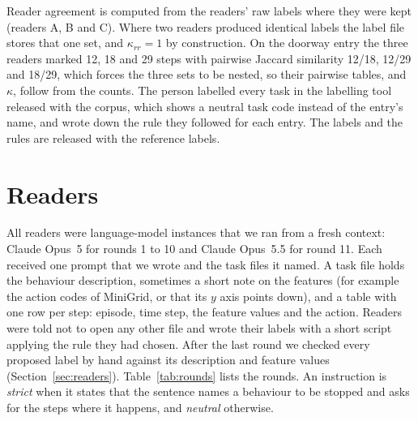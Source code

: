 Reader agreement is computed from the readers' raw labels where they were kept (readers A, B and C). Where two readers produced identical labels the label file stores that one set, and $\kappa_{rr}=1$ by construction. On the doorway entry the three readers marked 12, 18 and 29 steps with pairwise Jaccard similarity 12/18, 12/29 and 18/29, which forces the three sets to be nested, so their pairwise tables, and $\kappa$, follow from the counts. The person labelled every task in the labelling tool released with the corpus, which shows a neutral task code instead of the entry's name, and wrote down the rule they followed for each entry. The labels and the rules are released with the reference labels.

\section{Readers}
\label{app:readers}

All readers were language-model instances that we ran from a fresh context: Claude Opus~5 for rounds 1 to 10 and Claude Opus~5.5 for round 11. Each received one prompt that we wrote and the task files it named. A task file holds the behaviour description, sometimes a short note on the features (for example the action codes of MiniGrid, or that its $y$ axis points down), and a table with one row per step: episode, time step, the feature values and the action. Readers were told not to open any other file and wrote their labels with a short script applying the rule they had chosen. After the last round we checked every proposed label by hand against its description and feature values (Section~\ref{sec:readers}). Table~\ref{tab:rounds} lists the rounds. An instruction is \emph{strict} when it states that the sentence names a behaviour to be stopped and asks for the steps where it happens, and \emph{neutral} otherwise.

